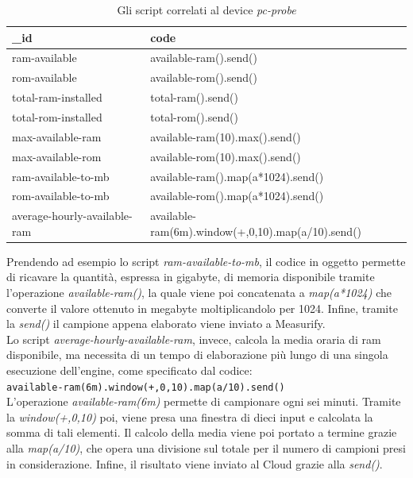 \begin{table}[H]
	\begin{tabular}{|p{}|p{}|}
		\hline
		\textbf{\_id} & \textbf{code} \\
		\hline
		ram-available & available-ram().send()\\
		\hline
		rom-available & available-rom().send()\\
		\hline
		total-ram-installed & total-ram().send()\\
		\hline
		total-rom-installed & total-rom().send()\\
		\hline
		max-available-ram & available-ram(10).max().send()\\	
		\hline
		max-available-rom & available-rom(10).max().send()\\
		\hline	
		ram-available-to-mb & available-ram().map(a*1024).send()\\
		\hline
		rom-available-to-mb & available-rom().map(a*1024).send()\\
		\hline
		average-hourly-available-ram & available-ram(6m).window(+,0,10).map(a/10).send()\\
		\hline
	\end{tabular}
	\caption{Gli script correlati al device \textit{pc-probe}}
	\label{script}
\end{table}
Prendendo ad esempio lo script \textit{ram-available-to-mb}, il codice in oggetto permette di ricavare la quantità, espressa in gigabyte, di memoria disponibile tramite l’operazione \textit{available-ram()}, la quale viene poi concatenata a \textit{map(a*1024)} che converte il valore ottenuto in megabyte moltiplicandolo per 1024. Infine, tramite la \textit{send()} il campione appena elaborato viene inviato a Measurify.\\
Lo script \textit{average-hourly-available-ram}, invece, calcola la media oraria di ram disponibile, ma necessita di un tempo di elaborazione più lungo di una singola esecuzione dell'engine, come specificato dal codice:\\ \texttt{available-ram(6m).window(+,0,10).map(a/10).send()}\\ L’operazione \textit{available-ram(6m)} permette di campionare ogni sei minuti. Tramite la \textit{window(+,0,10)} poi, viene presa una finestra di dieci input e calcolata la somma di tali elementi. Il calcolo della media viene poi portato a termine grazie alla \textit{map(a/10)}, che opera una divisione sul totale per il numero di campioni presi in considerazione. Infine, il risultato viene inviato al Cloud grazie alla \textit{send()}.\\ 
